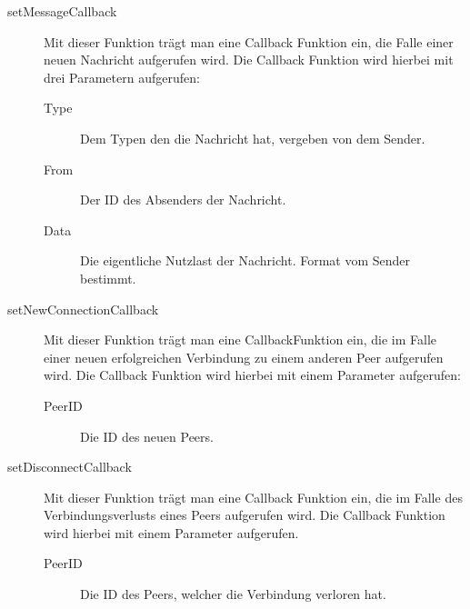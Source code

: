 \begin{description} \label{messagestructure}
\item[setMessageCallback]
Mit dieser Funktion trägt man eine Callback Funktion ein, die Falle einer neuen Nachricht aufgerufen wird. 
Die Callback Funktion wird hierbei mit drei Parametern aufgerufen:

  \begin{description}
  \item[Type]
  Dem Typen den die Nachricht hat, vergeben von dem Sender.
  
  \item[From]
  Der ID des Absenders der Nachricht.
  
  \item[Data]
  Die eigentliche Nutzlast der Nachricht. Format vom Sender bestimmt.
  \end{description}

\item[setNewConnectionCallback]
Mit dieser Funktion trägt man eine CallbackFunktion  ein, die im Falle einer neuen erfolgreichen Verbindung zu einem anderen Peer aufgerufen wird.
Die Callback Funktion wird hierbei mit einem Parameter aufgerufen:

  \begin{description}
  \item[PeerID]
  Die ID des neuen Peers.
  \end{description}
  
\item[setDisconnectCallback]
Mit dieser Funktion trägt man eine Callback Funktion ein, die im Falle des Verbindungsverlusts eines Peers aufgerufen wird.
Die Callback Funktion wird hierbei mit einem Parameter aufgerufen.

  \begin{description}
  \item[PeerID]
  Die ID des Peers, welcher die Verbindung verloren hat.
  \end{description}
\end{description}



